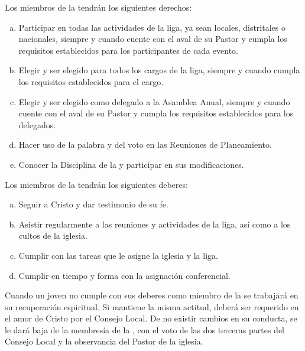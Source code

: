 

\article
\label{derechos-miembros}
Los miembros de la \LMJ{} tendrán los siguientes derechos:
\begin{enumerate}[a)]
    \item Participar en todas las actividades de la liga, ya sean locales, distritales o nacionales, siempre y cuando cuente con el aval de su Pastor y cumpla los requisitos establecidos para los participantes de cada evento.
    \item Elegir y ser elegido para todos los cargos de la liga, siempre y cuando cumpla los requisitos establecidos para el cargo.
    \item Elegir y ser elegido como delegado a la Asamblea Anual, siempre y cuando cuente con el aval de su Pastor y cumpla los requisitos establecidos para los delegados.
    \item Hacer uso de la palabra y del voto en las Reuniones de Planeamiento.
    \item Conocer la Disciplina de la \LMJ{} y participar en sus modificaciones.
\end{enumerate}

\article
\label{deberes-miembros}
Los miembros de la \LMJ{} tendrán los siguientes deberes:
\begin{enumerate}[a)]
    \item Seguir a Cristo y dar testimonio de su fe.
    \item Asistir regularmente a las reuniones y actividades de la liga, así como a los cultos de la iglesia.
    \item Cumplir con las tareas que le asigne la iglesia y la liga.
    \item Cumplir en tiempo y forma con la asignación conferencial.
\end{enumerate}

\article
Cuando un joven no cumple con sus deberes como miembro de la \LMJ{} se trabajará en su recuperación espiritual. Si mantiene la misma actitud, deberá ser requerido en el amor de Cristo por el Consejo Local. De no existir cambios en su conducta, se le dará baja de la membresía de la \LMJ{}, con el voto de las dos terceras partes del Consejo Local y la observancia del Pastor de la iglesia.

